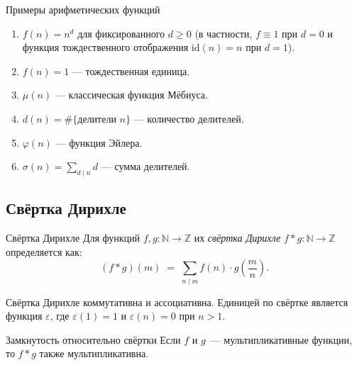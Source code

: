 \begin{Example}{Примеры арифметических функций}{}
	\begin{enumerate}
		\item $f(n) = n^d$ для фиксированного $d \geq 0$ (в частности, $f \equiv 1$ при $d=0$
		и функция тождественного отображения $\mathrm{id}(n) = n$ при $d=1$).
		\item $f(n) = 1$ --- тождественная единица.
		\item $\mu(n)$ --- классическая функция Мёбиуса.
		\item $d(n) = \#\{\text{делители }n\}$ --- количество делителей.
		\item $\varphi(n)$ --- функция Эйлера.
		\item $\sigma(n) = \sum_{d \mid n} d$ --- сумма делителей.
	\end{enumerate}
\end{Example}

\subsection{Свёртка Дирихле}

\begin{Definition}{Свёртка Дирихле}{}
	Для функций $f, g \colon \mathbb{N} \to \mathbb{Z}$ их
	\emph{свёртка Дирихле} $f * g \colon \mathbb{N} \to \mathbb{Z}$ определяется как:
	\[
	(f * g)(m) \;=\; \sum_{n \mid m} f(n)\cdot g\!\left(\frac{m}{n}\right).
	\]
\end{Definition}

\begin{Remark}{}{}
	Свёртка Дирихле коммутативна и ассоциативна. Единицей по свёртке является
	функция $\varepsilon$, где $\varepsilon(1) = 1$ и $\varepsilon(n) = 0$ при $n > 1$.
\end{Remark}

\begin{Theorem}{Замкнутость относительно свёртки}{}
	Если $f$ и $g$~--- мультипликативные функции, то $f * g$ также мультипликативна.
\end{Theorem}

